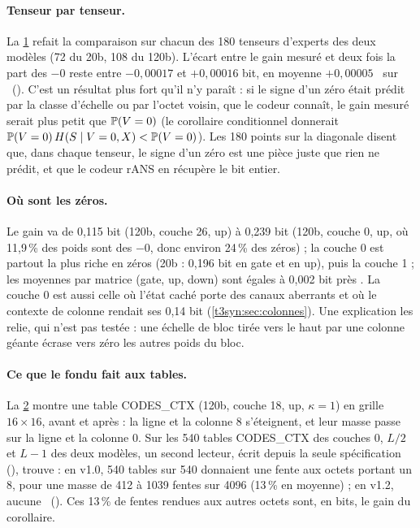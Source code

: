 \begin{figure}[tbp]
\centering
\GrapheCodonTheoreme
{}
\label{fig:t3-codon-theoreme}
\end{figure}

\paragraph{Tenseur par tenseur.} La \cref{fig:t3-codon-theoreme} refait la comparaison sur chacun des 180 tenseurs d'experts des deux modèles (72 du 20b, 108 du 120b). L'écart entre le gain mesuré et deux fois la part des $-0$ reste entre $-0{,}00017$ et $+0{,}00016$ bit, en moyenne $+0{,}00005$ \calc~sur \mes~(). C'est un résultat plus fort qu'il n'y paraît : si le signe d'un zéro était prédit par la classe d'échelle ou par l'octet voisin, que le codeur connaît, le gain mesuré serait plus petit que $\mathbb{P}(V = 0)$ (le corollaire conditionnel donnerait $\mathbb{P}(V = 0)\,H(S \mid V = 0, X) < \mathbb{P}(V = 0)$). Les 180 points sur la diagonale disent que, dans chaque tenseur, le signe d'un zéro est une pièce juste que rien ne prédit, et que le codeur rANS \parencite{duda2013ans,giesen2014interleaved} en récupère le bit entier.

\paragraph{Où sont les zéros.} Le gain va de 0,115 bit (120b, couche 26, up) à 0,239 bit (120b, couche 0, up, où 11,9\,\% des poids sont des $-0$, donc environ 24\,\% des zéros) ; la couche 0 est partout la plus riche en zéros (20b : 0,196 bit en gate et en up), puis la couche 1 ; les moyennes par matrice (gate, up, down) sont égales à 0,002 bit près \mes. La couche 0 est aussi celle où l'état caché porte des canaux aberrants et où le contexte de colonne rendait ses 0,14 bit (\cref{t3syn:sec:colonnes}). Une explication les relie, qui n'est pas testée : une échelle de bloc tirée vers le haut par une colonne géante écrase vers zéro les autres poids du bloc.

\begin{figure}[tbp]
\centering
\GrapheCodonOctets
{}
\label{fig:t3-codon-octets}
\end{figure}

\paragraph{Ce que le fondu fait aux tables.} La \cref{fig:t3-codon-octets} montre une table CODES\_CTX (120b, couche 18, up, $\kappa = 1$) en grille $16 \times 16$, avant et après : la ligne et la colonne 8 s'éteignent, et leur masse passe sur la ligne et la colonne 0. Sur les 540 tables CODES\_CTX des couches 0, $L/2$ et $L - 1$ des deux modèles, un second lecteur, écrit depuis la seule spécification (), trouve : en v1.0, 540 tables sur 540 donnaient une fente aux octets portant un 8, pour une masse de 412 à \num{1039} fentes sur \num{4096} (13\,\% en moyenne) ; en v1.2, aucune \mes~(). Ces 13\,\% de fentes rendues aux autres octets sont, en bits, le gain du corollaire.


